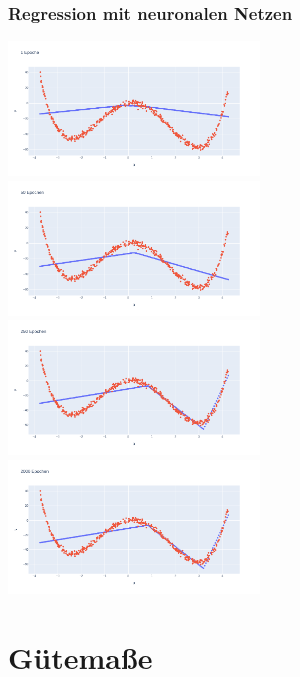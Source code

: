 
\begin{frame}
\frametitle{Regression mit neuronalen Netzen}

\begin{center}
	\includegraphics[width=0.5\textwidth]{fig8/nn_quartic_e1.png}%
	\includegraphics[width=0.5\textwidth]{fig8/nn_quartic_e50.png}
	\includegraphics[width=0.5\textwidth]{fig8/nn_quartic_e250.png}%
	\includegraphics[width=0.5\textwidth]{fig8/nn_quartic_e2000.png}
\end{center}

\end{frame}


\section{Gütemaße}



